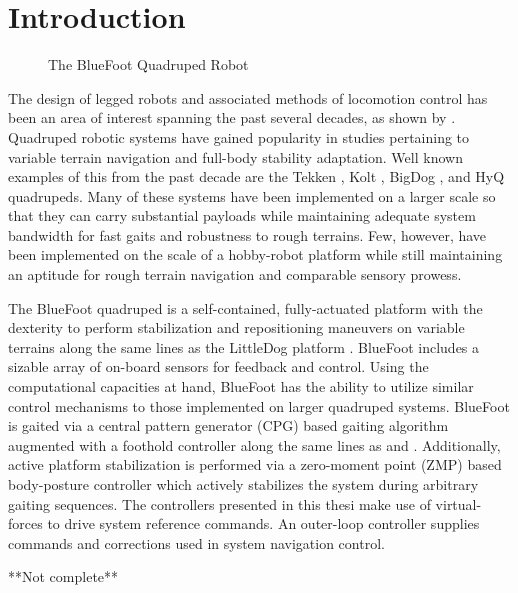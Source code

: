 \chapter{Introduction}
	\label{ch::introduction}
	
	\begin{figure}[h!]
		\centering
		\caption{The BlueFoot Quadruped Robot}
		\label{fig::bluefoot_glamour}
	\end{figure}
		The design of legged robots and associated methods of locomotion control has been an area of interest spanning the past several decades, as shown by		
		\cite{
		McGhee1965,
		Hodgins1991, 
		Altendorfer2001, 
		Kolter2008
		}.
		Quadruped robotic systems have gained popularity in studies pertaining to variable terrain navigation and full-body stability adaptation. Well known examples of this from the past decade are the Tekken \cite{Fukuoka2003}, Kolt \cite{Estremera2006}, BigDog \cite{BigDog2008}, and HyQ \cite{Semini2010_PHD} quadrupeds. Many of these systems have been implemented on a larger scale so that they can carry substantial payloads while maintaining adequate system bandwidth for fast gaits and robustness to rough terrains. Few, however, have been implemented on the scale of a hobby-robot platform while still maintaining an aptitude for rough terrain navigation and comparable sensory prowess.

		The BlueFoot quadruped is a self-contained, fully-actuated platform with the dexterity to perform stabilization and  repositioning maneuvers on variable terrains along the same lines as the LittleDog platform \cite{Rebula2007}. BlueFoot includes a sizable array of on-board sensors for feedback and control. Using the computational capacities at hand, BlueFoot has the ability to utilize similar control mechanisms to those implemented on larger quadruped systems. BlueFoot is  gaited via a central pattern generator (CPG) based gaiting algorithm augmented with a foothold controller along the same lines as \cite{Ajallooeian2013} and \cite{Rutishauser2008}. Additionally, active platform stabilization is performed via a zero-moment point (ZMP) based body-posture controller which actively stabilizes the system during arbitrary gaiting sequences. The controllers presented in this thesi make use of virtual-forces to drive system reference commands. An outer-loop controller supplies commands and corrections used in system navigation control.

**Not complete**